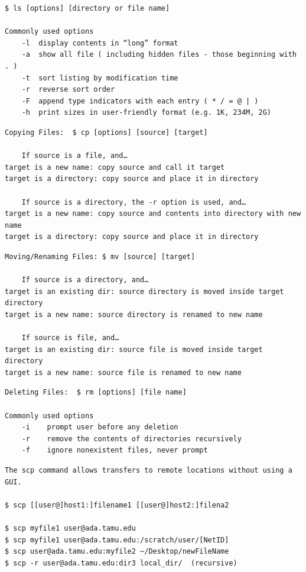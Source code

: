 \begin{verbatim}
$ ls [options] [directory or file name]

Commonly used options
	-l	display contents in “long” format
	-a	show all file ( including hidden files - those beginning with . )
	-t	sort listing by modification time
	-r	reverse sort order
	-F	append type indicators with each entry ( * / = @ | )
	-h	print sizes in user-friendly format (e.g. 1K, 234M, 2G)

\end{verbatim}

\begin{verbatim}
Copying Files:  $ cp [options] [source] [target]

	If source is a file, and…
target is a new name: copy source and call it target
target is a directory: copy source and place it in directory

	If source is a directory, the -r option is used, and…
target is a new name: copy source and contents into directory with new name
target is a directory: copy source and place it in directory
\end{verbatim}


\begin{verbatim}
Moving/Renaming Files: $ mv [source] [target]

	If source is a directory, and…
target is an existing dir: source directory is moved inside target directory
target is a new name: source directory is renamed to new name

	If source is file, and…
target is an existing dir: source file is moved inside target directory
target is a new name: source file is renamed to new name
\end{verbatim}


\begin{verbatim}
Deleting Files:  $ rm [options] [file name]

Commonly used options
	-i    prompt user before any deletion
	-r    remove the contents of directories recursively
	-f    ignore nonexistent files, never prompt
\end{verbatim}

\begin{Verbatim}
The scp command allows transfers to remote locations without using a GUI. 

$ scp [[user@]host1:]filename1 [[user@]host2:]filena2

$ scp myfile1 user@ada.tamu.edu
$ scp myfile1 user@ada.tamu.edu:/scratch/user/[NetID]
$ scp user@ada.tamu.edu:myfile2 ~/Desktop/newFileName
$ scp -r user@ada.tamu.edu:dir3 local_dir/  (recursive) 
\end{Verbatim}

